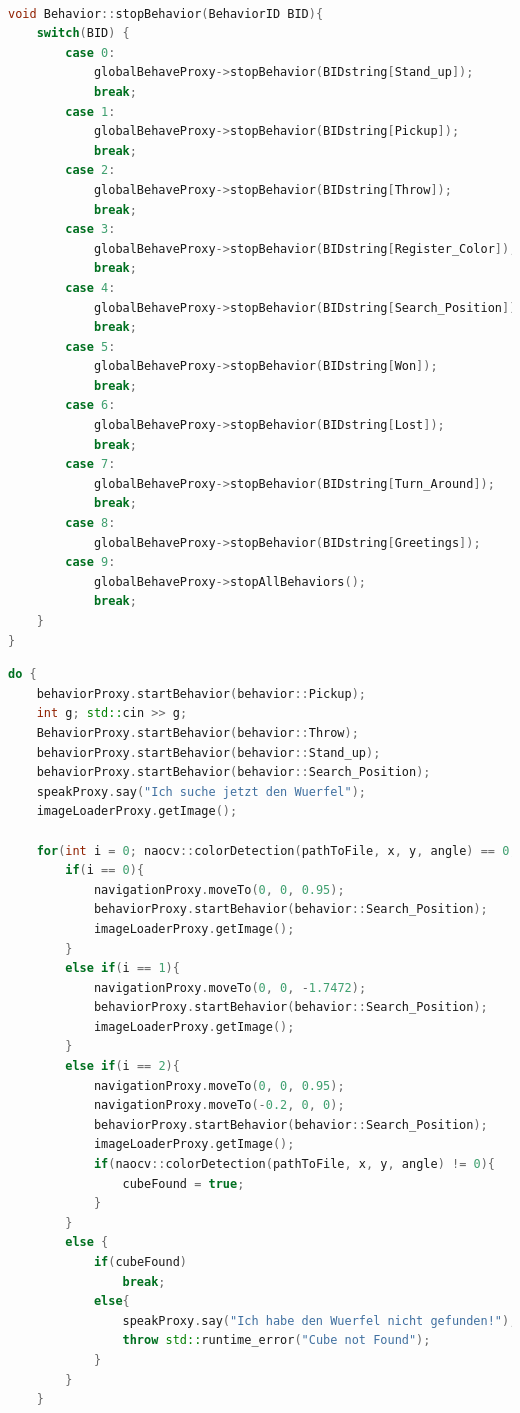 \begin{appendix}
\begin{lstlisting}[language=c++,
                   caption={Behavior Enumerator},
                   label={lst:behstop}]

void Behavior::stopBehavior(BehaviorID BID){
    switch(BID) {
        case 0:
            globalBehaveProxy->stopBehavior(BIDstring[Stand_up]);
            break;
        case 1:
            globalBehaveProxy->stopBehavior(BIDstring[Pickup]);
            break;
        case 2:
            globalBehaveProxy->stopBehavior(BIDstring[Throw]);
            break;
        case 3:
            globalBehaveProxy->stopBehavior(BIDstring[Register_Color]);
            break;
        case 4:
            globalBehaveProxy->stopBehavior(BIDstring[Search_Position]);
            break;
        case 5:
            globalBehaveProxy->stopBehavior(BIDstring[Won]);
            break;
        case 6:
            globalBehaveProxy->stopBehavior(BIDstring[Lost]);
            break;
        case 7:
            globalBehaveProxy->stopBehavior(BIDstring[Turn_Around]);
            break;
        case 8:
            globalBehaveProxy->stopBehavior(BIDstring[Greetings]);
        case 9:
            globalBehaveProxy->stopAllBehaviors();
            break;
    }
}
\end{lstlisting}

\begin{lstlisting}[language=c++,
                   caption={Mainloop},
                   label={lst:main1}]
do {
    behaviorProxy.startBehavior(behavior::Pickup);
    int g; std::cin >> g;
    BehaviorProxy.startBehavior(behavior::Throw);
    behaviorProxy.startBehavior(behavior::Stand_up);
    behaviorProxy.startBehavior(behavior::Search_Position);
    speakProxy.say("Ich suche jetzt den Wuerfel");
    imageLoaderProxy.getImage();

    for(int i = 0; naocv::colorDetection(pathToFile, x, y, angle) == 0; i++){
        if(i == 0){
            navigationProxy.moveTo(0, 0, 0.95);
            behaviorProxy.startBehavior(behavior::Search_Position);
            imageLoaderProxy.getImage();
        }
        else if(i == 1){
            navigationProxy.moveTo(0, 0, -1.7472);
            behaviorProxy.startBehavior(behavior::Search_Position);
            imageLoaderProxy.getImage();
        }
        else if(i == 2){
            navigationProxy.moveTo(0, 0, 0.95);
            navigationProxy.moveTo(-0.2, 0, 0);
            behaviorProxy.startBehavior(behavior::Search_Position);
            imageLoaderProxy.getImage();
            if(naocv::colorDetection(pathToFile, x, y, angle) != 0){
                cubeFound = true;
            }
        }
        else {
            if(cubeFound)
                break;
            else{
                speakProxy.say("Ich habe den Wuerfel nicht gefunden!");
                throw std::runtime_error("Cube not Found");
            }
        }
    }


\end{lstlisting}
\end{appendix}
